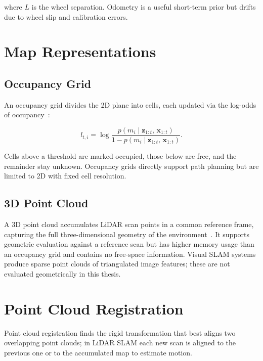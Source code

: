 \noindent where $L$ is the wheel separation. Odometry is a useful short-term
prior but drifts due to wheel slip and calibration errors.

\section{Map Representations}
\label{sec:map_representations}

\subsection{Occupancy Grid}

An occupancy grid divides the 2D plane into cells, each updated via the
log-odds of occupancy~\cite{thrun2005probabilistic}:

\begin{equation}
  l_{t,i} = \log \frac{p(m_i \mid \mathbf{z}_{1:t},\, \mathbf{x}_{1:t})}
                      {1 - p(m_i \mid \mathbf{z}_{1:t},\, \mathbf{x}_{1:t})}.
  \label{eq:log_odds}
\end{equation}

\noindent Cells above a threshold are marked occupied, those below are free,
and the remainder stay unknown.
Occupancy grids directly support path planning but are limited to 2D with
fixed cell resolution.

\subsection{3D Point Cloud}

A 3D point cloud accumulates LiDAR scan points in a common reference frame,
capturing the full three-dimensional geometry of the
environment~\cite{thrun2005probabilistic}.
It supports geometric evaluation against a reference scan but has higher memory
usage than an occupancy grid and contains no free-space information.
Visual SLAM systems produce sparse point clouds of triangulated image features;
these are not evaluated geometrically in this thesis.

\section{Point Cloud Registration}

Point cloud registration finds the rigid transformation that best aligns two
overlapping point clouds; in LiDAR SLAM each new scan is aligned to the
previous one or to the accumulated map to estimate motion.

